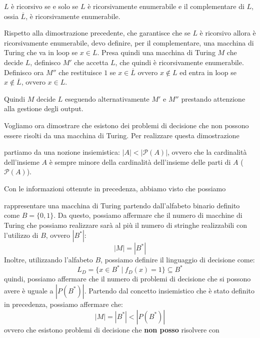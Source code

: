 \begin{teorema} \label{teo-rec-en-comp}
    $L$ è ricorsivo se e solo se $L$ è ricorsivamente enumerabile e il
    complementare di $L$, ossia $\overline{L}$, è ricorsivamente enumerabile.
\end{teorema}
\begin{dimostrazione}
    Rispetto alla dimostrazione precedente, che garantisce che se $L$ è ricorsivo
    allora è ricorsivamente enumerabile, devo definire, per il complementare,
    una macchina di Turing che va in loop se $x \in L$. Presa quindi una macchina
    di Turing $M$ che decide $L$, definisco $M'$ che accetta $L$, che quindi è
    ricorsivamente enumerabile. Definisco ora $M''$ che restituisce $1$ se
    $x \in \overline{L}$ ovvero $x \not\in L$ ed entra in loop se $x \not\in
        \overline{L}$, ovvero $x \in L$.

    Quindi $M$ decide $L$ eseguendo alternativamente $M'$ e $M''$ prestando
    attenzione alla gestione degli output.
\end{dimostrazione}
Vogliamo ora dimostrare che esistono dei problemi di decisione che non possono
essere risolti da una macchina di Turing. Per realizzare questa dimostrazione

partiamo da una nozione insiemistica: $|A| < |\mathcal{P}(A)|$, ovvero che la
cardinalità dell'insieme $A$ è sempre minore della cardinalità dell'insieme delle
parti di $A$ ($\mathcal{P}(A)$).

Con le informazioni ottenute in precedenza, abbiamo visto che possiamo

rappresentare una macchina di Turing partendo dall'alfabeto binario definito
come $B = \{0, 1\}$. Da questo, possiamo affermare che il numero di macchine di
Turing che possiamo realizzare sarà al più il numero di stringhe realizzabili
con l'utilizzo di $B$, ovvero $|B^{\ast}|$:
\begin{equation}
    |M| = |B^{\ast}|
\end{equation}
Inoltre, utilizzando l'alfabeto $B$, possiamo definire il linguaggio di
decisione come:
\begin{equation}
    L_D = \{x \in B^{\ast} \ | \ f_D(x) = 1\} \subseteq B^{\ast}
\end{equation}
quindi, possiamo affermare che il numero di problemi di decisione che si possono
avere è uguale a $|P(B^{\ast})|$. Partendo dal concetto insiemistico che è stato
definito in precedenza, possiamo affermare che:
\begin{equation}
    |M| = |B^{\ast}| < |P(B^{\ast})|
\end{equation}
ovvero che esistono problemi di decisione che \textbf{non posso} risolvere con


